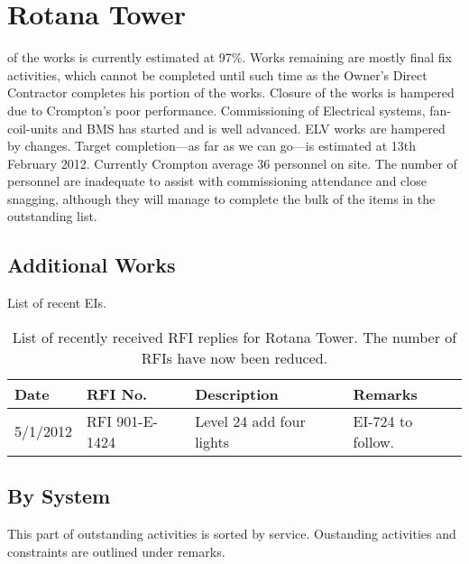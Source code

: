 \chapter{Rotana Tower}

 of the works is currently estimated at 97\%. Works remaining are mostly final fix activities, which cannot be completed until such time as the Owner's Direct Contractor completes his portion of the works.
Closure of the works is hampered due to  Crompton's poor performance. Commissioning of Electrical systems, fan-coil-units and BMS has started and is well advanced. ELV works are hampered by changes. Target completion---as far as we can go---is estimated at 13th February 2012. Currently Crompton average 36 personnel on site. The number of personnel are inadequate to assist with commissioning attendance and close snagging, although they will manage to complete the bulk of the items in the outstanding list.

\section{Additional Works}

List of recent EIs.


\begin{table}[htbp]
\small\RaggedRight
\begin{tabular}{@{}llp{3cm}p{3cm}}
\toprule
Date &RFI No. &Description &Remarks\\
\midrule
5/1/2012 &RFI 901-E-1424  &Level 24 add four lights &EI-724 to follow.\\
\bottomrule
\end{tabular}
\caption{List of recently received RFI replies for Rotana Tower. The number of RFIs have now been reduced.}
\end{table}


\section{By System}
This part of outstanding activities is sorted by service. Oustanding activities and constraints are outlined under remarks. 
\bigskip

